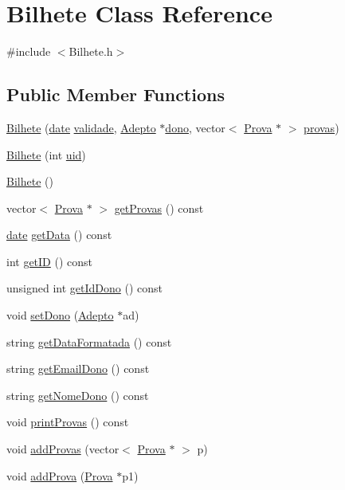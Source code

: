 \hypertarget{class_bilhete}{}\section{Bilhete Class Reference}
\label{class_bilhete}


{\ttfamily \#include $<$Bilhete.\+h$>$}

\subsection*{Public Member Functions}
\begin{DoxyCompactItemize}
\item 
\hyperlink{class_bilhete_abc0eccb3017774bf40eb09f25d63d008}{Bilhete} (\hyperlink{structdate}{date} \hyperlink{class_bilhete_adba6ea2eaaf920db79ed76698d7dcee6}{validade}, \hyperlink{class_adepto}{Adepto} $\ast$\hyperlink{class_bilhete_a10644168d3b284e0c4dad6c85e6a28ce}{dono}, vector$<$ \hyperlink{class_prova}{Prova} $\ast$ $>$ \hyperlink{class_bilhete_aac89dc945d1b4a00d296cec8d6a755d9}{provas})
\item 
\hyperlink{class_bilhete_ab7981f3702f74c570688bd9db2afc854}{Bilhete} (int \hyperlink{class_bilhete_a537bde09b332d1e4a06a8af3ad120732}{uid})
\item 
\hyperlink{class_bilhete_a3c69ddb7c2df72c5393fd4d155827086}{Bilhete} ()
\item 
vector$<$ \hyperlink{class_prova}{Prova} $\ast$ $>$ \hyperlink{class_bilhete_afdb4654e2a2b32102e67e7aec3bc14bb}{get\+Provas} () const 
\item 
\hyperlink{structdate}{date} \hyperlink{class_bilhete_a2261bf14cc65b43fa0312e15be051205}{get\+Data} () const 
\item 
int \hyperlink{class_bilhete_a10e93790a55f476b642630d76b7a0a26}{get\+I\+D} () const 
\item 
unsigned int \hyperlink{class_bilhete_ae9af9b7d7e95d09f1751d6954ab8485c}{get\+Id\+Dono} () const 
\item 
void \hyperlink{class_bilhete_ab9c561f39f792930691973f23b69c740}{set\+Dono} (\hyperlink{class_adepto}{Adepto} $\ast$ad)
\item 
string \hyperlink{class_bilhete_a81264c9ac5330e0c033e9ea8015653e1}{get\+Data\+Formatada} () const 
\item 
string \hyperlink{class_bilhete_a0906c4df61bb921c988ee076b35aa438}{get\+Email\+Dono} () const 
\item 
string \hyperlink{class_bilhete_a97571c40d6af971e66c28c82c1ba1235}{get\+Nome\+Dono} () const 
\item 
void \hyperlink{class_bilhete_a0a1c16bb609bb49d1a9a48e3d9ebce10}{print\+Provas} () const 
\item 
void \hyperlink{class_bilhete_a26fdc63b15aa11707a783b3c40ca22a6}{add\+Provas} (vector$<$ \hyperlink{class_prova}{Prova} $\ast$ $>$ p)
\item 
void \hyperlink{class_bilhete_abe2917d80d3e04630fd6221155a7aabb}{add\+Prova} (\hyperlink{class_prova}{Prova} $\ast$p1)
\end{DoxyCompactItemize}
